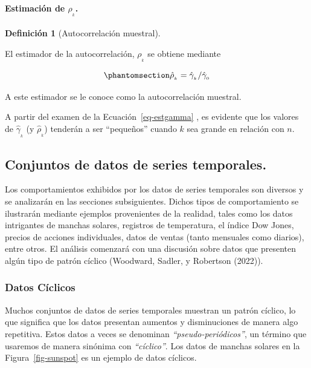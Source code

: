 \documentclass[
  us-letterpaper,
]{scrreprt}
\let\oldparagraph\paragraph
\renewcommand{\paragraph}[1]{\oldparagraph{#1}\mbox{}}
\theoremstyle{plain}
\theoremstyle{definition}
\theoremstyle{plain}
\theoremstyle{definition}
\newtheorem{definition}{Definición}[chapter]
\theoremstyle{remark}
\begin{document}
\paragraph{\texorpdfstring{Estimación de
\(\rho_{_k}\).}{Estimación de \textbackslash rho\_\{\_k\}.}}\label{estimaciuxf3n-de-rho__k.}

\begin{definition}[Autocorrelación
muestral]\protect\hypertarget{def-samplecorr}{}\label{def-samplecorr}

El estimador de la autocorrelación, \(\rho_{_{k}}\) se obtiene mediante

\begin{equation}\phantomsection\label{eq-sampleautocor}{
\hat\rho_{_{k}}=\hat\gamma_{_{k}}/\hat\gamma_{_{0}}
}\end{equation}

A este estimador se le conoce como la autocorrelación muestral.

\end{definition}

A partir del examen de la Ecuación~\ref{eq-estgamma} , es evidente que
los valores de \(\hat\gamma_{_{k}}\) (y \(\hat\rho_{_{k}}\)) tenderán a
ser ``pequeños'' cuando \(k\) sea grande en relación con \(n\).

\subsection{Conjuntos de datos de series
temporales.}\label{conjuntos-de-datos-de-series-temporales.}

Los comportamientos exhibidos por los datos de series temporales son
diversos y se analizarán en las secciones subsiguientes. Dichos tipos de
comportamiento se ilustrarán mediante ejemplos provenientes de la
realidad, tales como los datos intrigantes de manchas solares, registros
de temperatura, el índice Dow Jones, precios de acciones individuales,
datos de ventas (tanto mensuales como diarios), entre otros. El análisis
comenzará con una discusión sobre datos que presenten algún tipo de
patrón cíclico (Woodward, Sadler, y Robertson (2022)).

\subsubsection{Datos Cíclicos}\label{datos-cuxedclicos}

Muchos conjuntos de datos de series temporales muestran un patrón
cíclico, lo que significa que los datos presentan aumentos y
disminuciones de manera algo repetitiva. Estos datos a veces se
denominan \emph{``pseudo-periódicos''}, un término que usaremos de
manera sinónima con \emph{``cíclico''}. Los datos de manchas solares en
la Figura~\ref{fig-sunspot} es un ejemplo de datos cíclicos.
\end{document}
